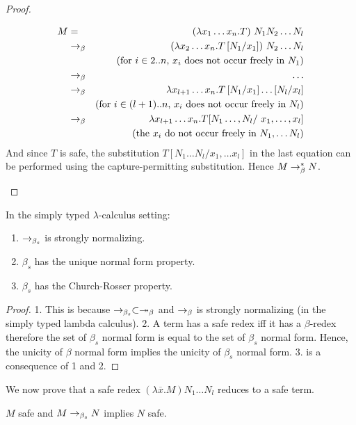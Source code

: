 \begin{proof}
\begin{itemize}
\begin{eqnarray*}
 M &=& (\lambda x_1 \ldots x_n .T) \ N_1  N_2 \ldots N_l  \\
     &\betared& (\lambda x_2 \ldots x_n .T \subst{N_1}{x_1} ) \ N_2 \ldots N_l \\
            && \mbox{(for $i \in 2..n$, $x_i$ does not occur freely in $N_1$)}\\
    &\betared& \ldots \\
    &\betared& \lambda x_{l+1} \ldots x_n . T \subst{N_1}{x_1}  \ldots \subst{N_l}{x_l} \\
        && \mbox{(for $i \in (l+1)..n$,  $x_i$ does not occur freely in $N_l$)}\\
    &\betared& \lambda x_{l+1} \ldots x_n . T [N_1\ldots, N_l /  \ x_1,\ldots, x_l] \\
        && \mbox{(the $x_i$ do not occur freely in $N_1, \ldots N_l$)}
\end{eqnarray*}
And since $T$ is safe, the substitution $T [N_1\ldots N_l/x_1,\ldots x_l]$ in the last equation
can be performed using the capture-permitting substitution. Hence $M \rightarrow_\beta^* N$.
\end{itemize}
\end{proof}

\begin{property} In the simply typed $\lambda$-calculus setting:
\begin{enumerate}
\item $\rightarrow_{\beta_s}$ is strongly normalizing.
\item $\beta_s$ has the unique normal form property.
\item $\beta_s$ has the Church-Rosser property.
\end{enumerate}
\end{property}

\begin{proof}
1. This is because $\rightarrow_{\beta_s} \subset \twoheadrightarrow_\beta$ and $\rightarrow_\beta$ is strongly normalizing (in the simply typed lambda calculus).
2. A term has a safe redex iff it has a $\beta$-redex therefore
the set of $\beta_s$ normal form is equal to the set of $\beta_s$
normal form. Hence, the unicity of $\beta$ normal form implies the
unicity of $\beta_s$ normal form.
3. is a consequence of 1 and 2.
\end{proof}


We now prove that a safe redex $(\lambda \overline{x} . M) N_1 \ldots N_l$ reduces to a safe term.

\begin{lem}
$M$ safe and $M \rightarrow_{\beta_s} N$ implies $N$ safe.
\end{lem}

